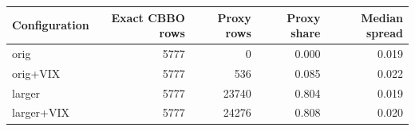 \begin{tabular}{lrrrr}
\toprule
Configuration & Exact CBBO rows & Proxy rows & Proxy share & Median spread \\
\midrule
orig & 5777 & 0 & 0.000 & 0.019 \\
orig+VIX & 5777 & 536 & 0.085 & 0.022 \\
larger & 5777 & 23740 & 0.804 & 0.019 \\
larger+VIX & 5777 & 24276 & 0.808 & 0.020 \\
\bottomrule
\end{tabular}
